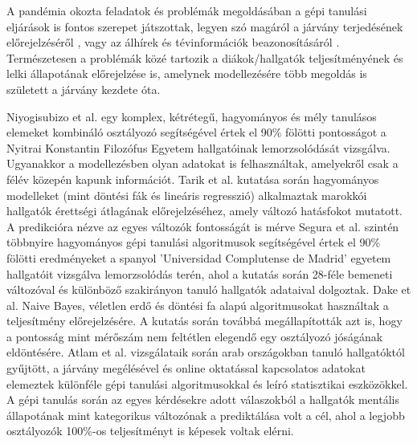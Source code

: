 \documentclass[12pt]{article}
\begin{document}

A pandémia okozta feladatok és problémák megoldásában a gépi tanulási eljárások is fontos szerepet játszottak, legyen szó magáról a járvány terjedésének előrejelzéséről \cite{mlr_1, mlr_2, student_perf4}, vagy az álhírek és tévinformációk beazonosításáról \cite{cov_solution3, cov_solution2, cov_solution}. Természetesen a problémák közé tartozik a diákok/hallgatók teljesítményének és lelki állapotának előrejelzése is, amelynek modellezésére több megoldás is született a járvány kezdete óta. 

Niyogisubizo et al. \cite{modeling1} egy komplex, kétrétegű, hagyományos és mély tanulásos elemeket kombináló osztályozó segítségével értek el 90\% fölötti pontosságot a Nyitrai Konstantin Filozófus Egyetem hallgatóinak lemorzsolódását vizsgálva. Ugyanakkor a modellezésben olyan adatokat is felhasználtak, amelyekről csak a félév közepén kapunk információt. Tarik et al. \cite{modeling3} kutatása során hagyományos modelleket (mint döntési fák és lineáris regresszió) alkalmaztak marokkói hallgatók érettségi átlagának előrejelzéséhez, amely változó hatásfokot mutatott. A predikcióra nézve az egyes változók fontosságát is mérve Segura et al. \cite{modeling2} szintén többnyire hagyományos gépi tanulási algoritmusok segítségével értek el 90\% fölötti eredményeket a spanyol 'Universidad Complutense de Madrid' egyetem hallgatóit vizsgálva lemorzsolódás terén, ahol a kutatás során 28-féle bemeneti változóval és különböző szakirányon tanuló hallgatók adataival dolgoztak. Dake et al. \cite{modeling4} Naive Bayes, véletlen erdő és döntési fa alapú algoritmusokat használtak a teljesítmény előrejelzésére. A kutatás során továbbá megállapították azt is, hogy a pontosság mint mérőszám nem feltétlen elegendő egy osztályozó jóságának eldöntésére. Atlam et al. \cite{student_perf3} vizsgálataik során arab országokban tanuló hallgatóktól gyűjtött, a járvány megélésével és online oktatással kapcsolatos adatokat elemeztek különféle gépi tanulási algoritmusokkal és leíró statisztikai eszközökkel. A gépi tanulás során az egyes kérdésekre adott válaszokból a hallgatók mentális állapotának mint kategorikus változónak a prediktálása volt a cél, ahol a legjobb osztályozók 100\%-os teljesítményt is képesek voltak elérni.
\end{document}
